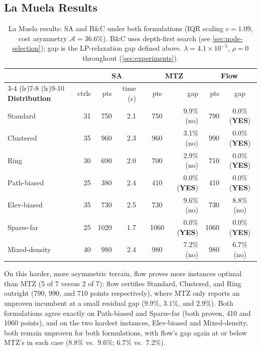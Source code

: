 \documentclass[11pt,a4paper]{article}
\begin{document}
\subsection{La Muela Results}

\begin{table}[H]
\centering
\caption{La Muela results: SA and B\&C under both formulations (IQR scaling $c = 1.09$, cost asymmetry $\mathcal{A} = 36.6\%$). B\&C uses depth-first search (see \cref{sec:node-selection}); gap is the LP-relaxation gap defined above. $\lambda = 4.1\times10^{-5}$, $\rho = 0$ throughout (\cref{sec:experiments}).}
\label{tab:lamuela}
\begin{tabular}{lrrrrrcrrc}
\toprule
& & \multicolumn{2}{c}{\textbf{SA}} & \multicolumn{2}{c}{\phantom{x}} & \multicolumn{2}{c}{\textbf{MTZ}} & \multicolumn{2}{c}{\textbf{Flow}} \\
\cmidrule(lr){3-4} \cmidrule(lr){7-8} \cmidrule(lr){9-10}
\textbf{Distribution} & ctrls & pts & time (s) & \multicolumn{2}{c}{} & pts & gap & pts & gap \\
\midrule
Standard        & 31 &  750 & 2.1 & \multicolumn{2}{c}{} &  750 &  9.9\% (no) &  790 &  0.0\% (\textbf{YES}) \\
Clustered       & 35 &  960 & 2.3 & \multicolumn{2}{c}{} &  960 &  3.1\% (no) &  990 &  0.0\% (\textbf{YES}) \\
Ring            & 30 &  690 & 2.0 & \multicolumn{2}{c}{} &  700 &  2.9\% (no) &  710 &  0.0\% (\textbf{YES}) \\
Path-biased     & 25 &  380 & 2.4 & \multicolumn{2}{c}{} &  410 &  0.0\% (\textbf{YES}) &  410 &  0.0\% (\textbf{YES}) \\
Elev-biased     & 35 &  730 & 2.5 & \multicolumn{2}{c}{} &  730 &  9.6\% (no) &  730 &  8.8\% (no) \\
Sparse-far      & 25 & 1020 & 1.7 & \multicolumn{2}{c}{} & 1060 &  0.0\% (\textbf{YES}) & 1060 &  0.0\% (\textbf{YES}) \\
Mixed-density   & 40 &  980 & 2.4 & \multicolumn{2}{c}{} &  980 &  7.2\% (no) &  980 &  6.7\% (no) \\
\bottomrule
\end{tabular}
\end{table}

On this harder, more asymmetric terrain, flow proves more instances optimal than MTZ (5 of 7 versus 2 of 7): flow certifies Standard, Clustered, and Ring outright (790, 990, and 710 points respectively), where MTZ only reports an unproven incumbent at a small residual gap ($9.9\%$, $3.1\%$, and $2.9\%$).
Both formulations agree exactly on Path-biased and Sparse-far (both proven, 410 and 1060 points), and on the two hardest instances, Elev-biased and Mixed-density, both remain unproven for both formulations, with flow's gap again at or below MTZ's in each case ($8.8\%$ vs.\ $9.6\%$; $6.7\%$ vs.\ $7.2\%$).
\end{document}
